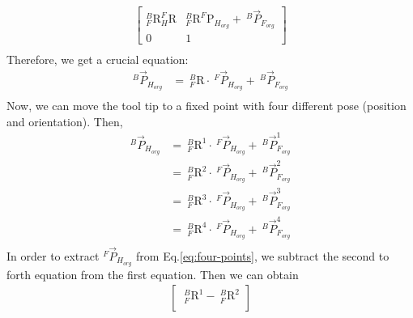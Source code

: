 \documentclass[12pt]{article}
\begin{document}
\begin{CJK}{UTF8}{bsmi}
\begin{equation}
\begin{split}
\begin{bmatrix}
_{F}^{B}\textrm{R}_{H}^{F}\textrm{R} & _{F}^{B}\textrm{R}^{F}\textrm{P}_{H_{org}} +\ ^{B}\vec{P}_{F_{org}}\\ 
0 & 1
\end{bmatrix}\\
\end{split}
\end{equation}
Therefore, we get a crucial equation:
\begin{equation}
\begin{split}
^{B}\vec{P}_{H_{org}} &=\  _{F}^{B}\textrm{R}\cdot\ ^{F}\vec{P}_{H_{org}} +\ ^{B}\vec{P}_{F_{org}}\\
\end{split}
\end{equation}
Now, we can move the tool tip to a fixed point with four different pose (position and orientation). Then,
\begin{equation}
\begin{split}																									
^{B}\vec{P}_{H_{org}} &=\  _{F}^{B}\textrm{R}^{1}\cdot\ ^{F}\vec{P}_{H_{org}} +\ ^{B}\vec{P}_{F_{org}}^{1}\\
					  &=\  _{F}^{B}\textrm{R}^{2}\cdot\ ^{F}\vec{P}_{H_{org}} +\ ^{B}\vec{P}_{F_{org}}^{2}\\
					  &=\  _{F}^{B}\textrm{R}^{3}\cdot\ ^{F}\vec{P}_{H_{org}} +\ ^{B}\vec{P}_{F_{org}}^{3}\\
					  &=\  _{F}^{B}\textrm{R}^{4}\cdot\ ^{F}\vec{P}_{H_{org}} +\ ^{B}\vec{P}_{F_{org}}^{4}\\
\end{split}\label{eq:four-points}
\end{equation}
In order to extract $^{F}\vec{P}_{H_{org}}$ from Eq.\ref{eq:four-points}, we subtract the second to forth equation from the first equation. Then we can obtain
\begin{equation}
\begin{split}	
\begin{bmatrix}
\  _{F}^{B}\textrm{R}^{1} - \  _{F}^{B}\textrm{R}^{2}\\ 

\end{bmatrix}
\end{split}
\end{equation}
\end{CJK}
\end{document}
